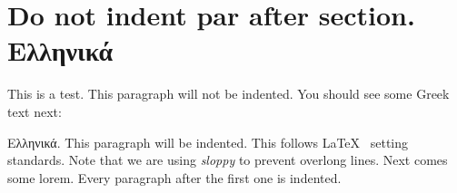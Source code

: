 \section{Do not indent par after section. Ελληνικά}
This is a test.  This paragraph will not be indented. You should see some Greek text next:

Ελληνικά.  This paragraph will be indented. This follows \LaTeX~
setting standards.  Note that we are using \textit{sloppy} to prevent overlong lines.
Next comes some lorem.  Every paragraph after the first one is indented.

\lipsum[1]

\lipsum[2]

\textit{\lipsum[3]}
